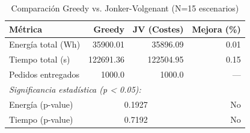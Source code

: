 \begin{table}[htbp]
\centering
\caption{Comparación Greedy vs. Jonker-Volgenant (N=15 escenarios)}
\label{tab:comparison}
\begin{tabular}{lrrr}
\hline
\textbf{Métrica} & \textbf{Greedy} & \textbf{JV (Costes)} & \textbf{Mejora (\%)} \\
\hline
Energía total (Wh) & 35900.01 & 35896.09 & 0.01 \\
Tiempo total (s) & 122691.36 & 122504.95 & 0.15 \\
Pedidos entregados & 1000.0 & 1000.0 & — \\
\hline
\multicolumn{4}{l}{\textit{Significancia estadística (p < 0.05):}} \\
Energía (p-value) & \multicolumn{2}{c}{0.1927} & No \\
Tiempo (p-value) & \multicolumn{2}{c}{0.7192} & No \\
\hline
\end{tabular}
\end{table}